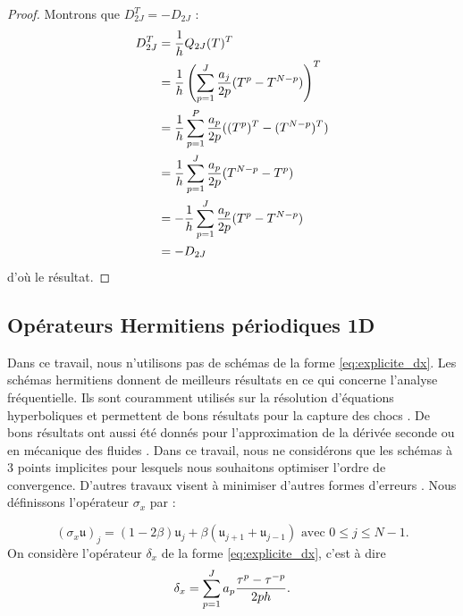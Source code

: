\begin{proof}
Montrons que $D_{2J}^T = - D_{2J}$ :
\begin{align*}
D_{2J}^T & = \dfrac{1}{h} Q_{2J}(T)^T \\
	& = \dfrac{1}{h} \left( \displaystyle\sum\limits_{p=1}^J \dfrac{a_j}{2p} (T^p - T^{N-p}) \right)^T\\
	& = \dfrac{1}{h}\displaystyle\sum\limits_{p=1}^P \dfrac{a_p}{2p} ((T^p)^T - (T^{N-p})^T) \\
	& = \dfrac{1}{h}\displaystyle\sum\limits_{p=1}^J \dfrac{a_p}{2p} (T^{N-p} - T^{p}) \\
	& = - \dfrac{1}{h} \displaystyle\sum\limits_{p=1}^J \dfrac{a_p}{2p} (T^p - T^{N-p}) \\
	& = - D_{2J}
\end{align*}
d'où le résultat.
\end{proof}




























\subsection{Opérateurs Hermitiens périodiques 1D}

Dans ce travail, nous n'utilisons pas de schémas de la forme \eqref{eq:explicite_dx}. Les schémas hermitiens \cite{Lele1991} donnent de meilleurs résultats en ce qui concerne l'analyse fréquentielle. Ils sont couramment utilisés sur la résolution d'équations hyperboliques \cite{Chu1998} et permettent de bons résultats pour la capture des chocs \cite{Jiang2001}. De bons résultats ont aussi été donnés pour l'approximation de la dérivée seconde \cite{Abbas2011, Keller1971} ou en mécanique des fluides \cite{BenArtzi2013,BenArtzi2005}. Dans ce travail, nous ne considérons que les schémas à 3 points implicites pour lesquels nous souhaitons optimiser l'ordre de convergence. D'autres travaux visent à minimiser d'autres formes d'erreurs \cite{Kim2007,Kim1996}. Nous définissons l'opérateur $\sigma_{x}$ par :

\begin{equation}
(\sigma_{x} \mathfrak{u})_j = (1-2\beta) \mathfrak{u}_j + \beta \left( \mathfrak{u}_{j+1} + \mathfrak{u}_{j-1} \right) \text{ avec } 0 \leq j \leq N-1.
\end{equation}
On considère l'opérateur $\delta_x$ de la forme \eqref{eq:explicite_dx}, c'est à dire
\begin{equation}
\delta_x = \displaystyle\sum\limits_{p=1}^J a_p \dfrac{\tau^p - \tau^{-p}}{2ph}.
\end{equation}

